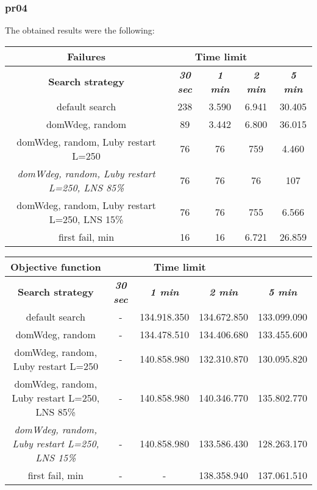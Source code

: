 \subsubsection{pr04}
The obtained results were the following:
{
\renewcommand{\arraystretch}{2}
\begin{longtable}[h]{| c | c | c | c | c |}
    \hline
    \textbf{Failures} & \multicolumn{3}{c}{Time limit} & \\
    \hline
    \textbf{Search strategy} & \textbf{\textit{30 sec}} & \textbf{\textit{1 min}} & \textbf{\textit{2 min}} & \textbf{\textit{5 min}} \\
    \hline
    \endhead
    default search                                         & 238 &  3.590 &  6.941 &  30.405 \\
    \hline
    domWdeg, random                                        &  89 &  3.442 &  6.800 &  36.015 \\
    \hline
    domWdeg, random, Luby restart L=250                    &  76 &    76 &   759 &   4.460 \\
    \hline
    \textit{domWdeg, random, Luby restart L=250, LNS 85\%} &  76 &    76 &    76 &    107 \\
    \hline
    domWdeg, random, Luby restart L=250, LNS 15\%          &  76 &    76 &   755 &   6.566 \\
    \hline
    first fail, min                                        &  16 &    16 &  6.721 &  26.859 \\
    \hline
\end{longtable}
}

{
\renewcommand{\arraystretch}{2}
\begin{longtable}[h]{| c | c | c | c | c |}
    \hline
    \textbf{Objective function} & \multicolumn{3}{c}{Time limit} & \\
    \hline
    \textbf{Search strategy} & \textbf{\textit{30 sec}} & \textbf{\textit{1 min}} & \textbf{\textit{2 min}} & \textbf{\textit{5 min}} \\
    \hline
    \endhead
    default search                                         &         - & 134.918.350 & 134.672.850 & 133.099.090 \\
    \hline
    domWdeg, random                                        &         - & 134.478.510 & 134.406.680 & 133.455.600 \\
    \hline
    domWdeg, random, Luby restart L=250                    &         - & 140.858.980 & 132.310.870 & 130.095.820 \\
    \hline
    domWdeg, random, Luby restart L=250, LNS 85\%          &         - & 140.858.980 & 140.346.770 & 135.802.770 \\
    \hline
    \textit{domWdeg, random, Luby restart L=250, LNS 15\%} &         - & 140.858.980 & 133.586.430 & 128.263.170 \\
    \hline
    first fail, min                                        &        - &         - & 138.358.940 & 137.061.510 \\
    \hline
\end{longtable}
}

